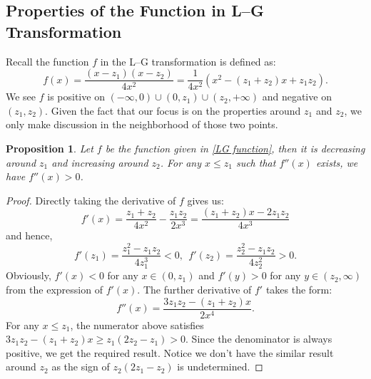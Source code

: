 \documentclass[11pt]{article}
\newtheorem{proposition}[theorem]{Proposition}
\numberwithin{equation}{section}%
\numberwithin{theorem}{section}
\begin{document}
\subsection{Properties of the Function in L--G Transformation}
Recall the function $f$ in the L--G transformation is defined as:
\begin{equation}\label{LG function}
    f(x)=\frac{(x-z_1)(x-z_2)}{4x^2}=\frac{1}{4x^2}\left(x^2-(z_1+z_2)x+z_1z_2\right).
\end{equation}
 We see $f$ is positive on $(-\infty,0)\cup(0,z_1)\cup(z_2,+\infty)$ and negative on $(z_1,z_2)$. Given the fact that our focus is on the properties around $z_1$ and $z_2$, we only make discussion in the neighborhood of those two points.
 \begin{proposition}\label{f M}
     Let $f$ be the function given in \eqref{LG function}, then it is decreasing around $z_1$ and increasing around $z_2$. For any $x\le z_1$ such that $f''(x)$ exists, we have $f''(x)>0$.
 \end{proposition}
 \begin{proof} Directly taking the derivative of $f$ gives us:
 \begin{equation*}
     f'(x)=\frac{z_1+z_2}{4x^2}-\frac{z_1z_2}{2x^3}=\frac{(z_1+z_2)x-2z_1z_2}{4x^3}
 \end{equation*}
  and hence,
  \begin{equation*}
      f'(z_1)=\frac{z_1^2-z_1z_2}{4z_1^3}<0,~~f'(z_2)=\frac{z_2^2-z_1z_2}{4z_2^2}>0.
  \end{equation*}
  Obviously, $f'(x)<0$ for any $x\in(0,z_1)$ and $f'(y)>0$ for any $y\in(z_2,\infty)$ from the expression of $f'(x)$.
  The further derivative of $f'$ takes the form:
\begin{equation*}
      f''(x)=\frac{3z_1z_2-(z_1+z_2)x}{2x^4}.
\end{equation*}
  For any $x\le z_1$, the numerator above satisfies $3z_1z_2-(z_1+z_2)x\ge z_1(2z_2-z_1)>0$. Since the denominator is always positive, we get the required result. Notice we don't have the similar result around $z_2$ as the sign of $z_2(2z_1-z_2)$ is undetermined.\end{proof}
\end{document}
